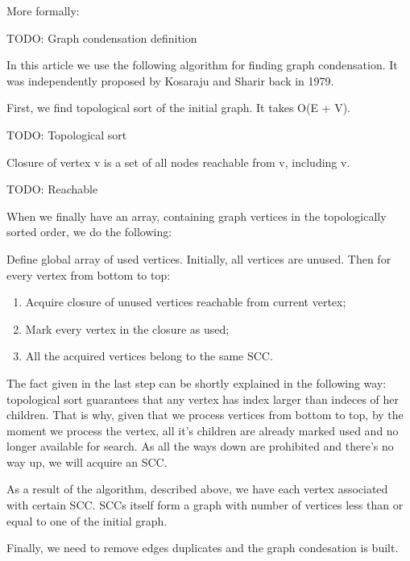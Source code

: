 \documentclass{svproc}
\begin{document}
More formally:\par
\begin{definition}
TODO: Graph condensation definition
\end{definition}

In this article we use the following algorithm for finding graph condensation.
It was independently proposed by Kosaraju and Sharir back in 1979.\par 
First, we find topological sort of the initial graph. It takes O(E + V).
\begin{definition}
TODO: Topological sort
\end{definition}

\begin{definition}
Closure of vertex v is a set of all nodes reachable from v, including v.
\end{definition}

\begin{definition}
TODO: Reachable
\end{definition}

When we finally have an array, containing graph vertices in the topologically sorted order, we do the following:

Define global array of used vertices. Initially, all vertices are unused.
Then for every vertex from bottom to top:
\begin{enumerate}
    \item Acquire closure of unused vertices reachable from current vertex; 
    \item Mark every vertex in the closure as used;
    \item All the acquired vertices belong to the same SCC.
\end{enumerate}

The fact given in the last step can be shortly explained in the following way:
topological sort guarantees that any vertex has index larger than indeces of her children.
That is why, given that we process vertices from bottom to top, by the moment we process the vertex, all it's children are already marked used and no longer available for search.
As all the ways down are prohibited and there's no way up, we will acquire an SCC.\par

As a result of the algorithm, described above, we have each vertex associated with certain SCC.
SCCs itself form a graph with number of vertices less than or equal to one of the initial graph.

Finally, we need to remove edges duplicates and the graph condesation is built. 
\end{document}
